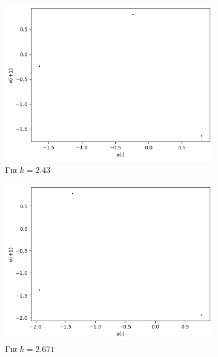 \begin{figure}[ht]
\begin{subfigure}[b]{0.4\textwidth}
		\includegraphics[width=\textwidth]{LateX images/sine q=-0.3/g5}
		\caption{Για $k=2.43$}
		\label{f:k118}
	\end{subfigure}
	\hfill
	\begin{subfigure}[b]{0.4\textwidth}
		\centering
		\includegraphics[width=\textwidth]{LateX images/sine q=-0.3/g6}
		\caption{Για $k=2.671$}
		\label{f:k119}
	\end{subfigure}
	\hfill
	\begin{subfigure}[b]{0.4\textwidth}
		\centering

\end{subfigure}
\end{figure}

